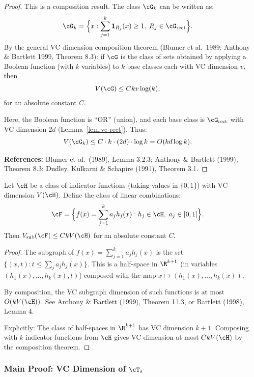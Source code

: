 \begin{proof}
This is a composition result. The class $\cG_k$ can be written as:
\[
\cG_k = \Bigl\{ x : \sum_{j=1}^k \mathbf{1}_{R_j}(x) \ge 1, \; R_j \in \cG_{\text{rect}} \Bigr\}.
\]
By the general VC dimension composition theorem (Blumer et al.\ 1989; Anthony \& Bartlett 1999, Theorem 8.3): if $\cG$ is the class of sets obtained by applying a Boolean function (with $k$ variables) to $k$ base classes each with VC dimension $v$, then
\[
V(\cG) \le C k v \log(k),
\]
for an absolute constant $C$.

Here, the Boolean function is ``OR'' (union), and each base class is $\cG_{\text{rect}}$ with VC dimension $2d$ (Lemma~\ref{lem:vc-rect}). Thus:
\[
V(\cG_k) \le C \cdot k \cdot (2d) \cdot \log k = O(kd \log k).
\]

\textbf{References:} Blumer et al.\ (1989), Lemma 3.2.3; Anthony \& Bartlett (1999), Theorem 8.3; Dudley, Kulkarni \& Schapire (1991), Theorem 3.1.
\end{proof}

\begin{lemma}
\label{lem:pseudo-linear}
Let $\cH$ be a class of indicator functions (taking values in $\{0,1\}$) with VC dimension $V(\cH)$. Define the class of linear combinations:
\[
\cF = \Bigl\{ f(x) = \sum_{j=1}^k a_j h_j(x) : h_j \in \cH, \; a_j \in [0,1] \Bigr\}.
\]
Then $V_{\text{sub}}(\cF) \le C k V(\cH)$ for an absolute constant $C$.
\end{lemma}

\begin{proof}
The subgraph of $f(x) = \sum_{j=1}^k a_j h_j(x)$ is the set $\{(x,t) : t \le \sum_j a_j h_j(x)\}$. This is a half-space in $\R^{k+1}$ (in variables $(h_1(x), \ldots, h_k(x), t)$) composed with the map $x \mapsto (h_1(x), \ldots, h_k(x))$.

By composition, the VC subgraph dimension of such functions is at most $O(k V(\cH))$. See Anthony \& Bartlett (1999), Theorem 11.3, or Bartlett (1998), Lemma 4.

Explicitly: The class of half-spaces in $\R^{k+1}$ has VC dimension $k+1$. Composing with $k$ indicator functions from $\cH$ gives VC dimension at most $C k V(\cH)$ by the composition theorem.
\end{proof}

\subsubsection*{Main Proof: VC Dimension of $\cT_s$}


